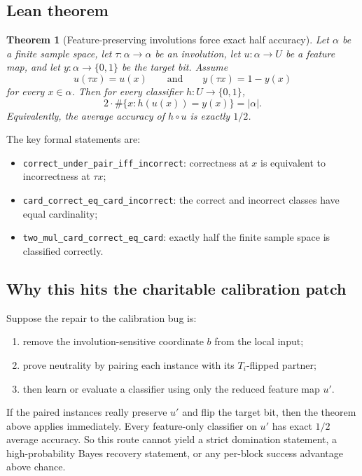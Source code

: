 \documentclass[11pt]{article}
\newtheorem{theorem}{Theorem}[section]
\theoremstyle{remark}
\begin{document}
\subsection{Lean theorem}

\begin{theorem}[Feature-preserving involutions force exact half accuracy]
Let \(\alpha\) be a finite sample space, let \(\tau : \alpha \to \alpha\) be an involution, let
\(u : \alpha \to U\) be a feature map, and let \(y : \alpha \to \{0,1\}\) be the target bit.
Assume
\[
  u(\tau x) = u(x)
  \qquad\text{and}\qquad
  y(\tau x) = 1 - y(x)
\]
for every \(x \in \alpha\).  Then for every classifier \(h : U \to \{0,1\}\),
\[
  2 \cdot \#\{x : h(u(x)) = y(x)\} = |\alpha|.
\]
Equivalently, the average accuracy of \(h \circ u\) is exactly \(1/2\).
\end{theorem}

\noindent
The key formal statements are:
\begin{itemize}[leftmargin=1.5em]
  \item \texttt{correct\_under\_pair\_iff\_incorrect}: correctness at \(x\) is equivalent to
  incorrectness at \(\tau x\);
  \item \texttt{card\_correct\_eq\_card\_incorrect}: the correct and incorrect classes have equal
  cardinality;
  \item \texttt{two\_mul\_card\_correct\_eq\_card}: exactly half the finite sample space is
  classified correctly.
\end{itemize}

\subsection{Why this hits the charitable calibration patch}

Suppose the repair to the calibration bug is:
\begin{enumerate}[leftmargin=1.5em]
  \item remove the involution-sensitive coordinate \(b\) from the local input;
  \item prove neutrality by pairing each instance with its \(T_i\)-flipped partner;
  \item then learn or evaluate a classifier using only the reduced feature map \(u'\).
\end{enumerate}

If the paired instances really preserve \(u'\) and flip the target bit, then the theorem above
applies immediately.  Every feature-only classifier on \(u'\) has exact \(1/2\) average accuracy.
So this route cannot yield a strict domination statement, a high-probability Bayes recovery
statement, or any per-block success advantage above chance.
\end{document}
